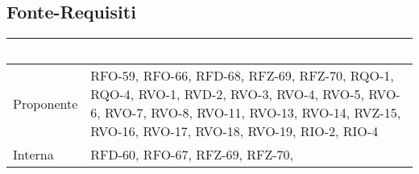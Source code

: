 \subsection{Fonte-Requisiti}
\renewcommand{\arraystretch}{1.45}
\begin{xltabular}{\textwidth}{|X| X |}
    \hline
     \textbf{\textcolor{white}{Fonte}} & \textbf{\textcolor{white}{Requisiti}}\\
    \hline
    \endhead
    Proponente & RFO-59, \newline
                RFO-66, \newline
                RFD-68, \newline
                RFZ-69, \newline
                RFZ-70, \newline
                RQO-1, \newline
                RQO-4, \newline
                RVO-1, \newline
                RVD-2, \newline
                RVO-3, \newline
                RVO-4, \newline
                RVO-5, \newline
                RVO-6, \newline
                RVO-7, \newline
                RVO-8, \newline
                RVO-11, \newline
                RVO-13, \newline
                RVO-14, \newline
                RVZ-15, \newline
                RVO-16, \newline
                RVO-17, \newline
                RVO-18, \newline
                RVO-19, \newline
                RIO-2, \newline
                RIO-4 \\
    \hline
     Interna &  RFD-60, \newline 
                RFO-67, \newline
                RFZ-69, \newline
                RFZ-70, \newline

\end{xltabular}
